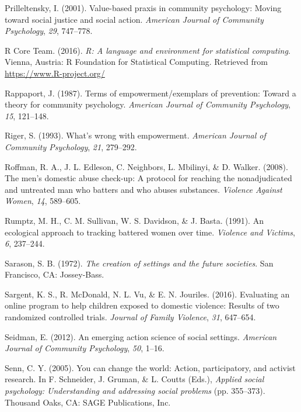 \documentclass[11pt,]{tufte-book}
\begin{document}
\hypertarget{ref-prilleltensky2001value-based}{}
Prilleltensky, I. (2001). Value-based praxis in community psychology:
Moving toward social justice and social action. \emph{American Journal
of Community Psychology}, \emph{29}, 747--778.

\hypertarget{ref-R-base}{}
R Core Team. (2016). \emph{R: A language and environment for statistical
computing}. Vienna, Austria: R Foundation for Statistical Computing.
Retrieved from \url{https://www.R-project.org/}

\hypertarget{ref-rappaport1987terms}{}
Rappaport, J. (1987). Terms of empowerment/exemplars of prevention:
Toward a theory for community psychology. \emph{American Journal of
Community Psychology}, \emph{15}, 121--148.

\hypertarget{ref-riger1993what}{}
Riger, S. (1993). What's wrong with empowerment. \emph{American Journal
of Community Psychology}, \emph{21}, 279--292.

\hypertarget{ref-roffman2008mens}{}
Roffman, R. A., J. L. Edleson, C. Neighbors, L. Mbilinyi, \& D. Walker.
(2008). The men's domestic abuse check-up: A protocol for reaching the
nonadjudicated and untreated man who batters and who abuses substances.
\emph{Violence Against Women}, \emph{14}, 589--605.

\hypertarget{ref-rumptz1991ecological}{}
Rumptz, M. H., C. M. Sullivan, W. S. Davidson, \& J. Basta. (1991). An
ecological approach to tracking battered women over time. \emph{Violence
and Victims}, \emph{6}, 237--244.

\hypertarget{ref-sarason1972creation}{}
Sarason, S. B. (1972). \emph{The creation of settings and the future
societies}. San Francisco, CA: Jossey-Bass.

\hypertarget{ref-sargent2016evaluating}{}
Sargent, K. S., R. McDonald, N. L. Vu, \& E. N. Jouriles. (2016).
Evaluating an online program to help children exposed to domestic
violence: Results of two randomized controlled trials. \emph{Journal of
Family Violence}, \emph{31}, 647--654.

\hypertarget{ref-seidman2012emerging}{}
Seidman, E. (2012). An emerging action science of social settings.
\emph{American Journal of Community Psychology}, \emph{50}, 1--16.

\hypertarget{ref-senn2005you}{}
Senn, C. Y. (2005). You can change the world: Action, participatory, and
activist research. In F. Schneider, J. Gruman, \& L. Coutts (Eds.),
\emph{Applied social psychology: Understanding and addressing social
problems} (pp. 355--373). Thousand Oaks, CA: SAGE Publications, Inc.
\end{document}

